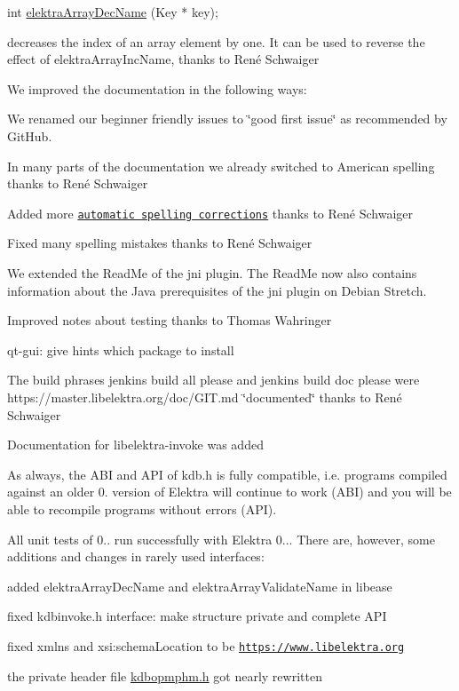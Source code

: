 \begin{DoxyCode}
\textcolor{keywordtype}{int} \hyperlink{array_8c_a4376537e9d6545dd26afe0c6c62dd9ed}{elektraArrayDecName} (Key * key);
\end{DoxyCode}


decreases the index of an array element by one. It can be used to reverse the effect of {\ttfamily elektra\+Array\+Inc\+Name}, thanks to René Schwaiger

We improved the documentation in the following ways\+:


\begin{DoxyItemize}
\item We renamed our beginner friendly issues to \char`\"{}good first issue\char`\"{} as recommended by Git\+Hub.
\item In many parts of the documentation we already switched to American spelling thanks to René Schwaiger
\item Added more \href{https://master.libelektra.org/scripts/sed}{\tt automatic spelling corrections} thanks to René Schwaiger
\item Fixed many spelling mistakes thanks to René Schwaiger
\item We extended the Read\+Me of the {\ttfamily jni} plugin. The Read\+Me now also contains information about the Java prerequisites of the {\ttfamily jni} plugin on Debian Stretch.
\item Improved notes about testing thanks to Thomas Wahringer
\item qt-\/gui\+: give hints which package to install
\item The build phrases {\ttfamily jenkins build all please} and {\ttfamily jenkins build doc please} were https\+://master.libelektra.\+org/doc/\+G\+IT.md \char`\"{}documented\char`\"{} thanks to René Schwaiger
\item Documentation for libelektra-\/invoke was added
\end{DoxyItemize}

As always, the A\+BI and A\+PI of kdb.\+h is fully compatible, i.\+e. programs compiled against an older 0. version of Elektra will continue to work (A\+BI) and you will be able to recompile programs without errors (A\+PI).

All unit tests of 0.. run successfully with Elektra 0... There are, however, some additions and changes in rarely used interfaces\+:


\begin{DoxyItemize}
\item added {\ttfamily elektra\+Array\+Dec\+Name} and {\ttfamily elektra\+Array\+Validate\+Name} in libease
\item fixed {\ttfamily kdbinvoke.\+h} interface\+: make structure private and complete A\+PI
\item fixed {\ttfamily xmlns} and {\ttfamily xsi\+:schema\+Location} to be {\ttfamily \href{https://www.libelektra.org}{\tt https\+://www.\+libelektra.\+org}}
\item the private header file {\ttfamily \hyperlink{kdbopmphm_8h}{kdbopmphm.\+h}} got nearly rewritten
\end{DoxyItemize}

